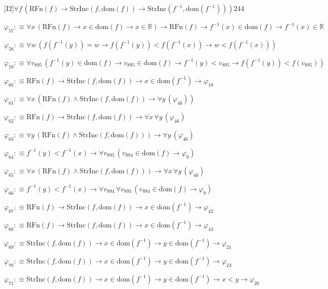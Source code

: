 \begin{fullproof}{[I2]}{$\forall f\,(\mathrm{RFn}(f) \to \mathrm{StrInc}(f,\mathrm{dom}(f)) \to \mathrm{StrInc}(f^{-1},\mathrm{dom}(f^{-1})))$}{244}
\begin{abbrevlist}
\item $\varphi_{57} :\equiv \forall x\,(\mathrm{RFn}(f) \to x \in \mathrm{dom}(f) \to x \in \mathbb{R}) \to \mathrm{RFn}(f) \to f^{-1}(x) \in \mathrm{dom}(f) \to f^{-1}(x) \in \mathbb{R}$
\item $\varphi_{58} :\equiv \forall w\,(f(f^{-1}(y)) = w \to f(f^{-1}(y)) < f(f^{-1}(x)) \to w < f(f^{-1}(x)))$
\item $\varphi_{59} :\equiv \forall v_{895}\,(f^{-1}(y) \in \mathrm{dom}(f) \to v_{895} \in \mathrm{dom}(f) \to f^{-1}(y) < v_{895} \to f(f^{-1}(y)) < f(v_{895}))$
\item $\varphi_{60} :\equiv \mathrm{RFn}(f) \to \mathrm{StrInc}(f,\mathrm{dom}(f)) \to x \in \mathrm{dom}(f^{-1}) \to \varphi_{19}$
\item $\varphi_{61} :\equiv \forall x\,(\mathrm{RFn}(f) \land \mathrm{StrInc}(f,\mathrm{dom}(f)) \to \forall y\,(\varphi_{46}))$
\item $\varphi_{62} :\equiv \mathrm{RFn}(f) \to \mathrm{StrInc}(f,\mathrm{dom}(f)) \to \forall x\,\forall y\,(\varphi_{46})$
\item $\varphi_{63} :\equiv \forall y\,(\mathrm{RFn}(f) \land \mathrm{StrInc}(f,\mathrm{dom}(f))) \to \forall y\,(\varphi_{46})$
\item $\varphi_{64} :\equiv f^{-1}(y) < f^{-1}(x) \to \forall v_{895}\,(v_{894} \in \mathrm{dom}(f) \to \varphi_{9})$
\item $\varphi_{65} :\equiv \forall x\,(\mathrm{RFn}(f) \land \mathrm{StrInc}(f,\mathrm{dom}(f))) \to \forall x\,\forall y\,(\varphi_{46})$
\item $\varphi_{66} :\equiv f^{-1}(y) < f^{-1}(x) \to \forall v_{894}\,\forall v_{895}\,(v_{894} \in \mathrm{dom}(f) \to \varphi_{9})$
\item $\varphi_{67} :\equiv \mathrm{RFn}(f) \to \mathrm{StrInc}(f,\mathrm{dom}(f)) \to x \in \mathrm{dom}(f^{-1}) \to \varphi_{42}$
\item $\varphi_{68} :\equiv \mathrm{RFn}(f) \to \mathrm{StrInc}(f,\mathrm{dom}(f)) \to x \in \mathrm{dom}(f^{-1}) \to \varphi_{43}$
\item $\varphi_{69} :\equiv \mathrm{StrInc}(f,\mathrm{dom}(f)) \to x \in \mathrm{dom}(f^{-1}) \to y \in \mathrm{dom}(f^{-1}) \to \varphi_{21}$
\item $\varphi_{70} :\equiv \mathrm{StrInc}(f,\mathrm{dom}(f)) \to x \in \mathrm{dom}(f^{-1}) \to y \in \mathrm{dom}(f^{-1}) \to \varphi_{23}$
\item $\varphi_{71} :\equiv \mathrm{StrInc}(f,\mathrm{dom}(f)) \to x \in \mathrm{dom}(f^{-1}) \to y \in \mathrm{dom}(f^{-1}) \to x < y \to \varphi_{20}$

\end{abbrevlist}
\end{fullproof}
